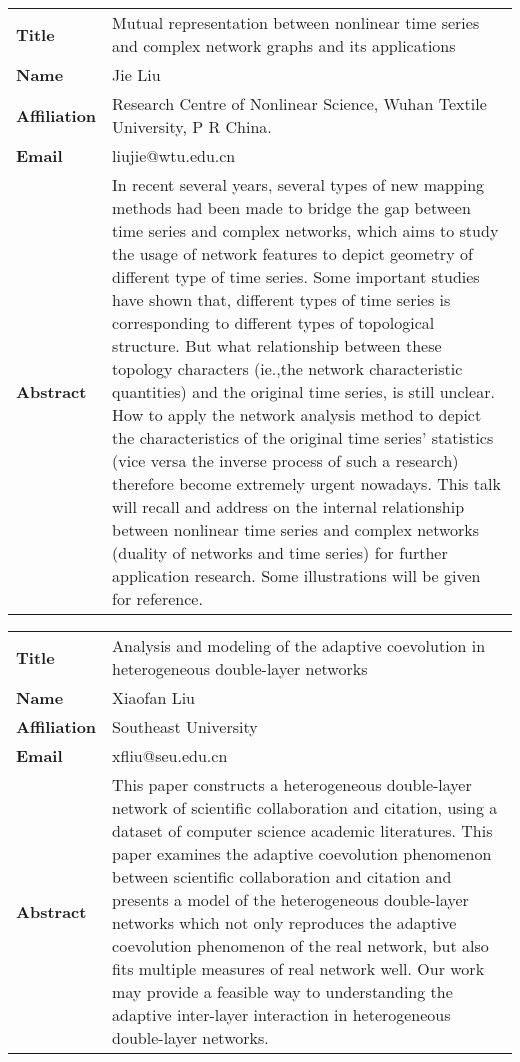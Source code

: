 \documentclass[oneside,A4paper,12pt]{article}
\begin{document}
\newpage
\begin{longtable}{p{2cm}p{14cm}}
\toprule
\textbf{Title} & Mutual representation between nonlinear time series and complex network graphs and its applications\\
\textbf{Name} & Jie Liu\\
\textbf{Affiliation} & Research Centre of Nonlinear Science, Wuhan Textile University, P R China.\\
\textbf{Email} & liujie@wtu.edu.cn\\
\textbf{Abstract} & In recent several years, several types of new mapping methods had been made to bridge the gap between time series and complex networks, which aims to study the usage of network features to depict geometry of different type of time series. Some important studies have shown that, different types of time series is corresponding to different types of topological structure. But what relationship between these topology characters (ie.,the network characteristic quantities) and the original time series, is still unclear. How to apply the network analysis method to depict the characteristics of the original time series' statistics (vice versa the inverse process of such a research) therefore become extremely urgent nowadays. This talk will recall and address on the internal relationship between nonlinear time series and complex networks (duality of networks and time series) for further application research. Some illustrations will be given for reference.\\
\bottomrule
\end{longtable}


\newpage
\begin{longtable}{p{2cm}p{14cm}}
\toprule
\textbf{Title} & Analysis and modeling of the adaptive coevolution in heterogeneous double-layer networks\\
\textbf{Name} & Xiaofan Liu\\
\textbf{Affiliation} & Southeast University\\
\textbf{Email} & xfliu@seu.edu.cn\\
\textbf{Abstract} & This paper constructs a heterogeneous double-layer network of scientific collaboration and citation, using a dataset of computer science academic literatures. This paper examines the adaptive coevolution phenomenon between scientific collaboration and citation and presents a model of the heterogeneous double-layer networks which not only reproduces the adaptive coevolution phenomenon of the real network, but also fits multiple measures of real network well. Our work may provide a feasible way to understanding the adaptive inter-layer interaction in heterogeneous double-layer networks.\\
\bottomrule
\end{longtable}
\end{document}
